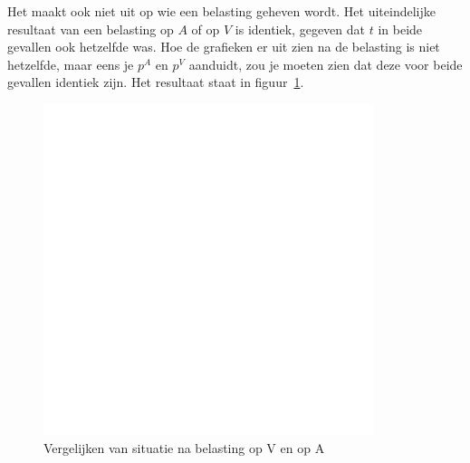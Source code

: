 Het maakt ook niet uit op wie een belasting geheven wordt. Het uiteindelijke resultaat van een belasting op $A$ of op $V$ is identiek, gegeven dat $t$ in beide gevallen ook hetzelfde was. Hoe de grafieken er uit zien na de belasting is niet hetzelfde, maar eens je $p^A$ en $p^V$ aanduidt, zou je moeten zien dat deze voor beide gevallen identiek zijn. Het resultaat staat in figuur~\ref{fig:vergelijkBelasting}.

\begin{figure}[htbp]
	\centering
	\includegraphics[scale=0.4]{Images/white.png}
	\caption{Vergelijken van situatie na belasting op V en op A}
	\label{fig:vergelijkBelasting}
\end{figure}
